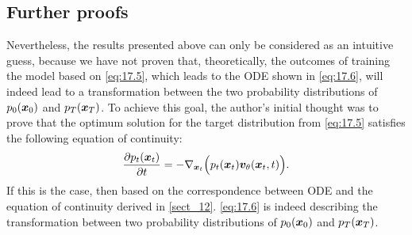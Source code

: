 \subsection{Further proofs}

Nevertheless, the results presented above can only be considered as an intuitive guess, because we have not proven that, theoretically, the outcomes of training the model based on \cref{eq:17.5}, which leads to the ODE shown in \cref{eq:17.6}, will indeed lead to a transformation between the two probability distributions of $p_0(\bm{x}_0)$ and $p_T(\bm{x}_T)$. To achieve this goal, the author's initial thought was to prove that the optimum solution for the target distribution from \cref{eq:17.5} satisfies the following equation of continuity:
\begin{equation}
    \label{eq:17.11}
    \frac{\partial p_{t}(\bm{x}_{t})}{\partial t}=-\nabla_{\bm{x}_{t}}\Bigl( p_t(\bm{x}_{t})\bm{v}_{\theta}(\bm{x}_{t},t) \Bigr).
\end{equation}
If this is the case, then based on the correspondence between ODE and the equation of continuity derived in \cref{sect_12}. \cref{eq:17.6} is indeed describing the transformation between two probability distributions of $p_0(\bm{x}_0)$ and $p_T(\bm{x}_T)$.

